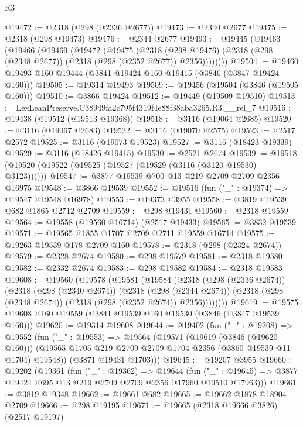 \begin{lexlean}{R3}
\begin{coremodule}
@19472 := @2318 (@298 (@2336 @2677))
@19473 := @2340 @2677
@19475 := @2318 (@298 @19473)
@19476 := @2344 @2677
@19493 := @19445
    (@19463
      (@19466
        (@19469
          (@19472
            (@19475
              (@2318
                (@298 @19476)
                (@2318 (@298 (@2348 @2677)) (@2318 (@298 (@2352 @2677)) @2356))))))))
@19504 := @19460 @19493 @160 @19444 (@3841 @19424 @160 @19415 (@3846 (@3847 @19424 @160)))
@19505 := @19314 @19493
@19509 := @19456 (@19504 (@3846 (@19505 @160)))
@19510 := @3866 @19424
@19512 := @19449 (@19509 @19510)
@19513 := LexLeanPreserve.C38949fa2c795f4319f4e88f38aba3265.R3.__rel_7
@19516 := @19438 (@19512 (@19513 @19368))
@19518 := @3116 (@19064 @2685)
@19520 := @3116 (@19067 @2683)
@19522 := @3116 (@19070 @2575)
@19523 := @2517 @2572
@19525 := @3116 (@19073 @19523)
@19527 := @3116 (@18423 @19339)
@19529 := @3116 (@18426 @19415)
@19530 := @2521 @2674
@19539 := @19518 (@19520 (@19522 (@19525 (@19527 (@19529 (@3116 (@3120 @19530) @3123))))))
@19547 := @3877 @19539 @700 @13 @219 @2709 @2709 @2356 @16975
@19548 := @3866 @19539
@19552 := @19516 (fun ("_" : @19374) => @19547 @19548 @16978)
@19553 := @19373 @3955
@19558 := @3819 @19539 @682 @1865 @2712 @2709
@19559 := @298 @19431
@19560 := @2318 @19559
@19564 := @19558 (@19560 @16714) (@2517 @19433)
@19565 := @3832 @19539
@19571 := @19565 @1855 @1707 @2709 @2711 @19559 @16714
@19575 := @19263 @19539 @178 @2709 @160
@19578 := @2318 (@298 (@2324 @2674))
@19579 := @2328 @2674
@19580 := @298 @19579
@19581 := @2318 @19580
@19582 := @2332 @2674
@19583 := @298 @19582
@19584 := @2318 @19583
@19608 := @19560
    (@19578
      (@19581
        (@19584
          (@2318
            (@298 (@2336 @2674))
            (@2318
              (@298 (@2340 @2674))
              (@2318
                (@298 (@2344 @2674))
                (@2318 (@298 (@2348 @2674)) (@2318 (@298 (@2352 @2674)) @2356))))))))
@19619 := @19575 @19608 @160 @19559 (@3841 @19539 @160 @19530 (@3846 (@3847 @19539 @160)))
@19620 := @19314 @19608
@19644 := @19402
    (fun ("_" : @19208) =>
    @19552
      (fun ("_" : @19553) =>
      @19564
        (@19571
          (@19619 (@3846 (@19620 @160)))
          (@19565 @1705 @219 @2709 @2709 @1704 @2356 (@3860 @19539 @11 @1704) @19548))
        (@3871 @19431 @1703)))
@19645 := @19207 @3955
@19660 := @19202
    (@19361
      (fun ("_" : @19362) =>
      @19644
        (fun ("_" : @19645) => @3877 @19424 @695 @13 @219 @2709 @2709 @2356 @17960 @19510 @17963)))
@19661 := @3819 @19348
@19662 := @19661 @682
@19665 := @19662 @1878 @18904 @2709
@19666 := @298 @19195
@19671 := @19665 (@2318 @19666 @3826) (@2517 @19197)

\end{coremodule}
\end{lexlean}
